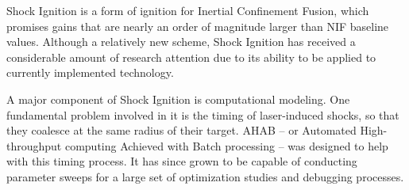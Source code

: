 
\setlength{\parindent}{0cm}

Shock Ignition is a form of ignition for Inertial Confinement Fusion, which promises gains that are nearly an order of magnitude larger than NIF baseline values.  Although a relatively new scheme, Shock Ignition has received a considerable amount of research attention due to its ability to be applied to currently implemented technology.

A major component of Shock Ignition is computational modeling. One fundamental problem involved in it is the timing of laser-induced shocks, so that they coalesce at the same radius of their target.  AHAB -- or Automated High-throughput computing Achieved with Batch processing -- was designed to help with this timing process.  It has since grown to be capable of conducting parameter sweeps for a large set of optimization studies and debugging processes.

\setlength{\parindent}{\default}

